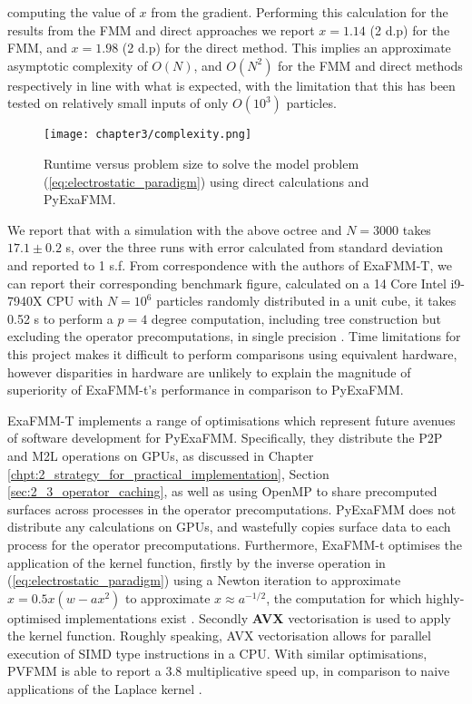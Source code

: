 computing the value of $x$ from the gradient. Performing this calculation for the
results from the \gls{FMM} and direct approaches we report $x=1.14$ (2 d.p) for
the FMM, and $x=1.98$ (2 d.p) for the direct method. This implies an approximate
asymptotic complexity of $O(N)$, and $O(N^2)$ for the \gls{FMM} and direct methods
respectively in line with what is expected, with the limitation that this has
been tested on relatively small inputs of only $O(10^3)$ particles.

\begin{figure}[ht]
    \centering

  {\texttt{[image: chapter3/complexity.png]}}
  \vspace{0pt}
    \caption{
        Runtime versus problem size to solve the model problem
        (\ref{eq:electrostatic_paradigm}) using direct calculations and
        \gls{PyExaFMM}.
    }
    \label{fig:3_1_complexity}
\end{figure}

We report that with a simulation with the above octree and
$N=3000$ takes $17.1 \pm 0.2$ s, over the three runs with
error calculated from standard deviation and reported to 1 s.f. From correspondence
with the authors of ExaFMM-T, we can report their corresponding benchmark figure,
calculated on a 14 Core Intel i9-7940X \gls{CPU} with $N=10^6$ particles
randomly distributed in a unit cube, it takes 0.52 s to perform a $p=4$ degree
computation, including tree construction but excluding the
operator precomputations, in single precision \cite{exafmm}. Time limitations for this project
makes it difficult to perform comparisons using equivalent hardware, however
disparities in hardware are unlikely to explain the magnitude of superiority
of ExaFMM-t's performance in comparison to \gls{PyExaFMM}.

ExaFMM-T implements a range of optimisations which represent future avenues
of software development for \gls{PyExaFMM}. Specifically, they distribute the
\gls{P2P} and \gls{M2L} operations on \gls{GPU}s, as discussed in Chapter
\ref{chpt:2_strategy_for_practical_implementation},
Section \ref{sec:2_3_operator_caching}, as well as using \gls{OpenMP} to share
precomputed surfaces across processes in the operator precomputations.
\gls{PyExaFMM} does not distribute any calculations on \gls{GPU}s, and
wastefully copies surface data to each process for the operator precomputations.
Furthermore, ExaFMM-t optimises the application of the kernel function,
firstly by the inverse operation in (\ref{eq:electrostatic_paradigm}) using a Newton
iteration to approximate $x = 0.5x(w-ax^2)$ to approximate $x \approx a ^{-1/2}$,
the computation for which highly-optimised implementations exist
\cite{Lomont:2003, sqrt}. Secondly \textbf{\gls{AVX}} vectorisation is used
to apply the kernel function. Roughly speaking, \gls{AVX} vectorisation allows
for parallel execution of \gls{SIMD} type instructions in a \gls{CPU}. With similar
optimisations, PVFMM is able to report a 3.8 multiplicative speed up, in
comparison to naive applications of the Laplace kernel \cite{Malhotra:2015:CCP}.

